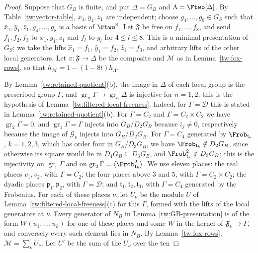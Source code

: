 \begin{proof}
Suppose that $G_B$ is finite, and put $\Delta=G_B$ and
$\Lambda=\Ftwo[\Delta]$. By Table~\ref{tw:vector-table},
$\bar x_1,\bar y_1,\bar z_1$ are independent; choose
$g_4,\dots,g_8\in G_S$ such that
$\bar x_1,\bar y_1,\bar z_1,\bar g_4,\dots,\bar g_8$ is a basis of
$\Ftwo^8$. Let $\mathfrak F$ be free on $f_1,\dots,f_8$, and send
$f_1,f_2,f_3$ to $x_1,y_1,z_1$ and $f_l$ to $g_l$ for $4\le l\le8$. This is a
minimal presentation of
$G_S$; we take the lifts $\hat x_1=f_1$, $\hat y_1=f_2$,
$\hat z_1=f_3$, and arbitrary lifts of the other local generators. Let
$\pi\colon\mathfrak F\to\Delta$ be the composite and $\mathcal M$ as in
Lemma~\ref{tw:fox-rows}, so that $h_{\mathcal M}=1-(1-8t)h_\Lambda$.

By Lemma~\ref{tw:retained-quotient}(b), the image in $\Delta$ of each
local group is the prescribed group $\Gamma$, and
$\operatorname{gr}_n\Gamma\to\operatorname{gr}_n\Delta$ is injective for
$n=1,2$; this is the hypothesis of
Lemma~\ref{tw:filtered-local-freeness}. Indeed, for $\Gamma=\mathcal D$ this is stated
in Lemma~\ref{tw:retained-quotient}(b). For $\Gamma=C_2$ and
$\Gamma=C_2\times C_2$ we have $\operatorname{gr}_2\Gamma=0$, and
$\operatorname{gr}_1\Gamma=\Gamma$ injects into $G_B/D_2G_B$ because
$\bar\iota_j\ne0$, respectively because the image of $\mathcal G_\nu$ injects
into $G_B/D_2G_B$. For $\Gamma=C_4$ generated by $\Frob_{\mathfrak t_k}$, $k=1,2,3$,
which has order four in $G_B/D_3G_B$, we have
$\Frob_{\mathfrak t_k}\notin D_2G_B$, since otherwise its square would lie in
$D_4G_B\subseteq D_3G_B$, and $\Frob_{\mathfrak t_k}^2\notin D_3G_B$; this is
the injectivity on $\operatorname{gr}_1\Gamma$ and on
$\operatorname{gr}_2\Gamma=\langle\Frob_{\mathfrak t_k}^2\rangle$. We use
eleven places: the real
places $v_1,v_2$, with $\Gamma=C_2$; the four places above $3$ and $5$, with
$\Gamma=C_2\times C_2$; the dyadic places $\mathfrak p_1,\mathfrak p_2$, with
$\Gamma=\mathcal D$; and $\mathfrak t_1,\mathfrak t_2,\mathfrak t_3$, with $\Gamma=C_4$
generated by the Frobenius. For each of these places $\nu$, let $U_\nu$ be
the module $U$ of Lemma~\ref{tw:filtered-local-freeness}(c) for this $\Gamma$,
formed with the lifts of the local generators at $\nu$. Every generator of
$N_B$ in Lemma~\ref{tw:GB-presentation} is of the form $W(u_1,\dots,u_k)$ for
one of these places and some $W$ in the kernel of $\mathfrak F_k\to\Gamma$, and
conversely every such element lies in $N_B$. By Lemma~\ref{tw:fox-rows},
$\mathcal M=\sum_\nu U_\nu$. Let $U'$ be the sum of the $U_\nu$ over the ten

\end{proof}

